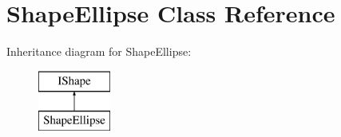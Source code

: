 \hypertarget{class_shape_ellipse}{}\section{Shape\+Ellipse Class Reference}
\label{class_shape_ellipse}
Inheritance diagram for Shape\+Ellipse\+:\begin{figure}[H]
\begin{center}
\leavevmode
\includegraphics[height=2.000000cm]{class_shape_ellipse}
\end{center}
\end{figure}
